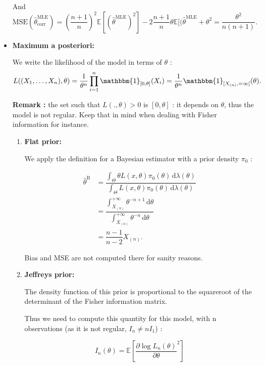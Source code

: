 \begin{itemize}
And $$\text{MSE}(\hat{\theta}_{\text{corr}}^{\text{MLE}}) = \left(\dfrac{n+1}{n}\right)^2 \mathbb{E}[(\hat{\theta}^{\text{MLE}})^2] - 2\dfrac{n+1}{n}\theta \mathbb{E}[(\hat{\theta}^{\text{MLE}} + \theta^2 = \dfrac{\theta^2}{n(n+1)}.$$

\item \textbf{Maximum a posteriori:}

We write the likelihood of the model in terms of $\theta$ :
$$L((X_1,\dots,X_n), \theta) = \dfrac{1}{\theta^n} \prod_{i=1}^{n} \mathbbm{1}_{[0, \theta]}(X_i) = \dfrac{1}{\theta^n} \mathbbm{1}_{[X_{(n)}, =\infty[}(\theta).$$

\textbf{Remark :} the set such that $L(., \theta)>0$ is $[0, \theta]$ : it depends on $\theta$, thus the model is not regular. Keep that in mind when dealing with Fisher information for instance.\newline

\begin{enumerate}
    \item \textbf{Flat prior:}\newline

We apply the definition for a Bayesian estimator with a prior density $\pi_0$ :

\begin{align*}
    \hat{\theta}^{\text{B}} &= \dfrac{\displaystyle \int_{\Theta} \theta L(x, \theta) \pi_0(\theta) \, \mathrm{d}\lambda(\theta)}{\displaystyle \int_{\Theta} L(x, \theta) \pi_0(\theta) \, \mathrm{d}\lambda(\theta)}\\
    &= \dfrac{\displaystyle \int_{X_{(n)}}^{+\infty} \theta^{-n+1} \, \mathrm{d}\theta}{\displaystyle \int_{X_{(n)}}^{+\infty} \theta^{-n} \, \mathrm{d}\theta}\\
    &= \dfrac{n-1}{n-2}X_{(n)}.
\end{align*}

Bias and MSE are not computed there for sanity reasons.

    \item \textbf{Jeffreys prior:}\newline

The density function of this prior is proportional to the squareroot of the determinant of the Fisher information matrix.\newline

Thus we need to compute this quantity for this model, with n observations (as it is not regular, $I_n \ne n I_1$) :

$$I_n(\theta) = \mathbb{E}\left[\dfrac{\partial \log L_n(\theta)}{\partial \theta}^2\right]$$


\end{enumerate}
\end{itemize}
